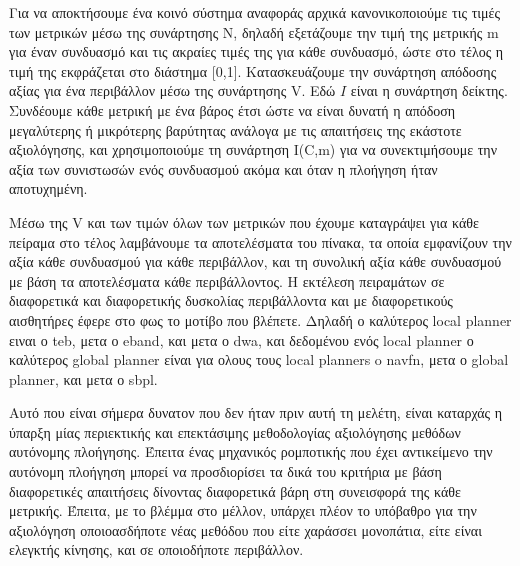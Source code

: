 \documentclass[a4paper,10pt]{article}
\begin{document}
Για να αποκτήσουμε ένα κοινό σύστημα αναφοράς αρχικά κανονικοποιούμε τις τιμές
των μετρικών μέσω της συνάρτησης N, δηλαδή εξετάζουμε την τιμή της μετρικής m
για έναν συνδυασμό και τις ακραίες τιμές της για κάθε συνδυασμό, ώστε στο τέλος
η τιμή της εκφράζεται στο διάστημα [0,1].  Κατασκευάζουμε την συνάρτηση
απόδοσης αξίας για ένα περιβάλλον μέσω της συνάρτησης V. Εδώ $I$ είναι η
συνάρτηση δείκτης. Συνδέουμε κάθε μετρική με ένα βάρος έτσι ώστε να είναι
δυνατή η απόδοση μεγαλύτερης ή μικρότερης βαρύτητας ανάλογα με τις απαιτήσεις
της εκάστοτε αξιολόγησης, και χρησιμοποιούμε τη συνάρτηση I(C,m) για να
συνεκτιμήσουμε την αξία των συνιστωσών ενός συνδυασμού ακόμα και όταν η
πλοήγηση ήταν αποτυχημένη.

Μέσω της V και των τιμών όλων των μετρικών που έχουμε καταγράψει για κάθε
πείραμα στο τέλος λαμβάνουμε τα αποτελέσματα του πίνακα, τα οποία εμφανίζουν
την αξία κάθε συνδυασμού για κάθε περιβάλλον, και τη συνολική αξία κάθε
συνδυασμού με βάση τα αποτελέσματα κάθε περιβάλλοντος. Η εκτέλεση πειραμάτων σε
διαφορετικά και διαφορετικής δυσκολίας περιβάλλοντα και με διαφορετικούς
αισθητήρες έφερε στο φως το μοτίβο που βλέπετε. Δηλαδή ο καλύτερος local planner
ειναι ο teb, μετα ο eband, και μετα ο dwa, και δεδομένου ενός local planner
ο καλύτερος global planner είναι για ολους τους local planners o navfn, μετα ο
global planner, και μετα ο sbpl.

Αυτό που είναι σήμερα δυνατον που δεν ήταν πριν αυτή τη μελέτη, είναι
καταρχάς η ύπαρξη μίας περιεκτικής και επεκτάσιμης μεθοδολογίας αξιολόγησης
μεθόδων αυτόνομης πλοήγησης. Έπειτα ένας μηχανικός ρομποτικής που έχει
αντικείμενο την αυτόνομη πλοήγηση μπορεί να προσδιορίσει τα δικά του κριτήρια
με βάση διαφορετικές απαιτήσεις δίνοντας διαφορετικά βάρη στη συνεισφορά της
κάθε μετρικής. Έπειτα, με το βλέμμα στο μέλλον, υπάρχει πλέον το υπόβαθρο για
την αξιολόγηση οποιοασδήποτε νέας μεθόδου που είτε χαράσσει μονοπάτια, είτε
είναι ελεγκτής κίνησης, και σε οποιοδήποτε περιβάλλον.
\end{document}

